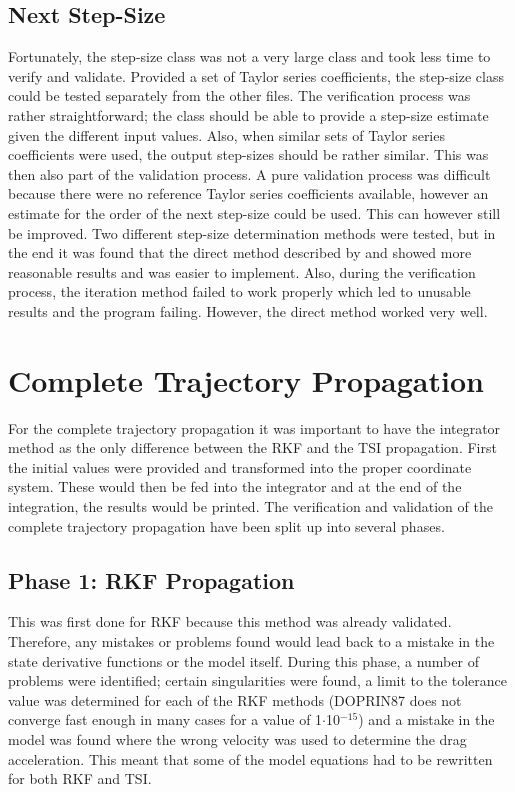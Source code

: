 \subsection{Next Step-Size}
\label{subsec:nextStepSizeverval}
Fortunately, the step-size class was not a very large class and took less time to verify and validate. Provided a set of Taylor series coefficients, the step-size class could be tested separately from the other files. The verification process was rather straightforward; the class should be able to provide a step-size estimate given the different input values. Also, when similar sets of Taylor series coefficients were used, the output step-sizes should be rather similar. This was then also part of the validation process. A pure validation process was difficult because there were no reference Taylor series coefficients available, however an estimate for the order of the next step-size could be used. This can however still be improved. Two different step-size determination methods were tested, but in the end it was found that the direct method described by \cite{scott2008high} and \cite{bergsma2015application} showed more reasonable results and was easier to implement. Also, during the verification process, the iteration method failed to work properly which led to unusable results and the program failing. However, the direct method worked very well.




\section{Complete Trajectory Propagation}
\label{sec:propverval}
For the complete trajectory propagation it was important to have the integrator method as the only difference between the \ac{RKF} and the \ac{TSI} propagation. First the initial values were provided and transformed into the proper coordinate system. These would then be fed into the integrator and at the end of the integration, the results would be printed. The verification and validation of the complete trajectory propagation have been split up into several phases.


\subsection{Phase 1: \ac{RKF} Propagation}
\label{subsec:phase1com}
This was first done for \ac{RKF} because this method was already validated. Therefore, any mistakes or problems found would lead back to a mistake in the state derivative functions or the model itself.
During this phase, a number of problems were identified; certain singularities were found, a limit to the tolerance value was determined for each of the \ac{RKF} methods (\ac{DOPRIN87} does not converge fast enough in many cases for a value of 1$\cdot$10$^{-15}$) and a mistake in the model was found where the wrong velocity was used to determine the drag acceleration. This meant that some of the model equations had to be rewritten for both \ac{RKF} and \ac{TSI}. 

